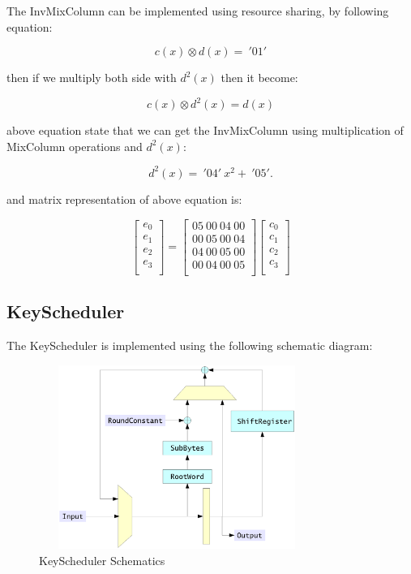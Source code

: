 \documentclass[a4paper,12pt]{report}
\begin{document}
The InvMixColumn can be implemented using resource sharing, by following
equation:

\begin{equation}
c(x) \otimes d(x) =~'01'
\end{equation}

then if we multiply both side with $d^2(x)$ then it become:

\begin{equation}
c(x) \otimes d^2(x) = d(x)
\end{equation}

above equation state that we can get the InvMixColumn  using
multiplication of MixColumn operations and $d^2(x)$:

\begin{equation}
d^2(x) =~'04'~x^2 +~'05'.
\end{equation}

and matrix representation of above equation is:

\begin{displaymath}
\left[ \begin{array}{c} e_0\\ e_1\\ e_2\\ e_3\\ \end{array} \right]
=
\left[ \begin{array}{c} 05~00~04~00\\ 00~05~00~04\\ 04~00~05~00\\ 00~04~00~05\\ \end{array} \right]
\left[ \begin{array}{c} c_0\\ c_1\\ c_2\\ c_3\\ \end{array} \right]
\end{displaymath}

\subsection{KeyScheduler}

The KeyScheduler is implemented using the following schematic diagram:

\begin{figure}[H]
\center
\includegraphics[width=9cm,height=6cm]{key_scheduler.eps}
\caption{KeyScheduler Schematics}
\label{key_scheduler}
\end{figure}
\end{document}
